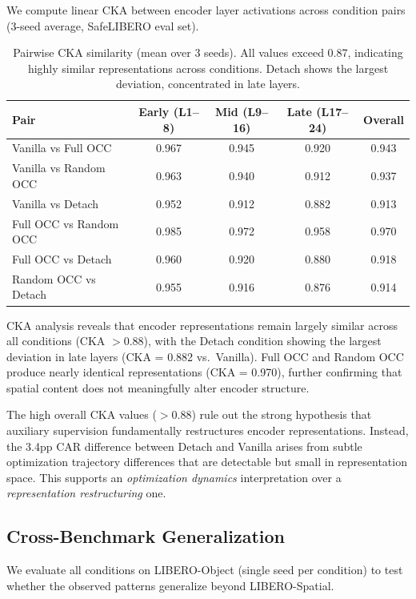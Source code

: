 \documentclass[10pt,letterpaper]{article}
\begin{document}
We compute linear CKA between encoder layer activations across condition pairs (3-seed average, SafeLIBERO eval set).

\begin{table}[t]
\centering
\caption{Pairwise CKA similarity (mean over 3 seeds). All values exceed 0.87, indicating highly similar representations across conditions. Detach shows the largest deviation, concentrated in late layers.}
\label{tab:cka}
\begin{tabular}{lcccc}
\toprule
Pair & Early (L1--8) & Mid (L9--16) & Late (L17--24) & Overall \\
\midrule
Vanilla vs Full OCC    & 0.967 & 0.945 & 0.920 & 0.943 \\
Vanilla vs Random OCC  & 0.963 & 0.940 & 0.912 & 0.937 \\
Vanilla vs Detach      & 0.952 & 0.912 & 0.882 & 0.913 \\
Full OCC vs Random OCC & 0.985 & 0.972 & 0.958 & 0.970 \\
Full OCC vs Detach     & 0.960 & 0.920 & 0.880 & 0.918 \\
Random OCC vs Detach   & 0.955 & 0.916 & 0.876 & 0.914 \\
\bottomrule
\end{tabular}
\end{table}

CKA analysis reveals that encoder representations remain largely similar across all conditions (CKA $> 0.88$), with the Detach condition showing the largest deviation in late layers (CKA = 0.882 vs.\ Vanilla). Full OCC and Random OCC produce nearly identical representations (CKA = 0.970), further confirming that spatial content does not meaningfully alter encoder structure.

The high overall CKA values ($> 0.88$) rule out the strong hypothesis that auxiliary supervision fundamentally restructures encoder representations. Instead, the 3.4pp CAR difference between Detach and Vanilla arises from subtle optimization trajectory differences that are detectable but small in representation space. This supports an \emph{optimization dynamics} interpretation over a \emph{representation restructuring} one.

\subsection{Cross-Benchmark Generalization}
\label{sec:cross}

We evaluate all conditions on LIBERO-Object (single seed per condition) to test whether the observed patterns generalize beyond LIBERO-Spatial.
\end{document}

